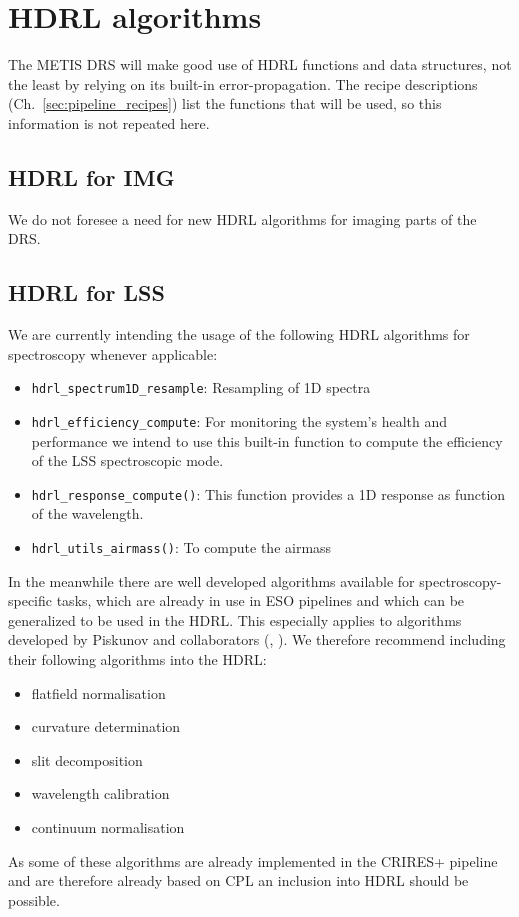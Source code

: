 \clearpage
\section{HDRL algorithms}\label{sec:hdrl_algorithms}

The METIS DRS will make good use of \ac{HDRL} functions and data structures, not
the least by relying on its built-in error-propagation. The recipe descriptions
(Ch.~\ref{sec:pipeline_recipes}) list the functions that will be used, so this
information is not repeated here.

\subsection{HDRL for IMG}\label{ssec:hdrlimg}

We do not foresee a need for new \ac{HDRL} algorithms for imaging parts of the DRS.


\subsection{HDRL for LSS}\label{ssec:hdrllss}
We are currently intending the usage of the following \ac{HDRL} algorithms for spectroscopy whenever applicable:
\begin{itemize}
    \item \texttt{hdrl\_spectrum1D\_resample}: Resampling of 1D spectra
    \item \texttt{hdrl\_efficiency\_compute}: For monitoring the system's health and performance we intend to use this built-in function to compute the efficiency of the \ac{LSS} spectroscopic mode.
    \item \texttt{hdrl\_response\_compute()}: This function provides a 1D response as function of the wavelength. 
    \item \texttt{hdrl\_utils\_airmass()}: To compute the airmass
\end{itemize}

In the meanwhile there are well developed algorithms available for spectroscopy-specific tasks, which are already in use in ESO pipelines and which can be generalized to be used in the \ac{HDRL}. This especially applies to algorithms developed by Piskunov and collaborators (\cite{pis21}, \cite{pis02}). We therefore recommend including their following algorithms into the \ac{HDRL}:
\begin{itemize}
    \item flatfield normalisation
    \item curvature determination
    \item slit decomposition
    \item wavelength calibration
    \item continuum normalisation
\end{itemize}
As some of these algorithms are already implemented in the \ac{CRIRES}+ pipeline
and are therefore already based on \ac{CPL} an inclusion into \ac{HDRL} should
be possible.

